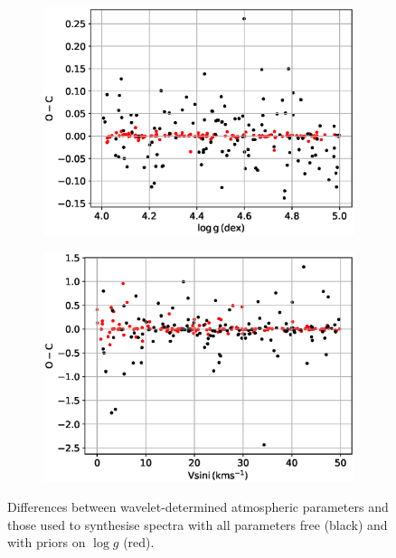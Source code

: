 \begin{figure}
\begin{subfigure}[b]{0.5\linewidth}
    \includegraphics[width=\linewidth]{5-images/selfL.eps} 
    \label{fig7:c} 
  \end{subfigure}%
  \begin{subfigure}[b]{0.5\linewidth}
    \centering
    \includegraphics[width=\linewidth]{5-images/selfV.eps} 
    \label{fig7:d} 
  \end{subfigure} 
  \caption{Differences between wavelet-determined atmospheric parameters and those used to synthesise spectra with all parameters free (black) and with priors on $\log g$ (red). }

  \label{wavelet:fig:self_consistency}   
\end{figure}


